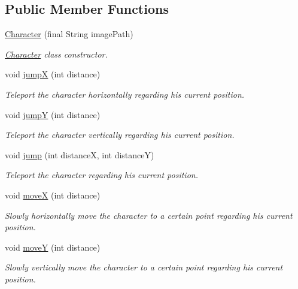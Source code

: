 \subsection*{Public Member Functions}
\begin{DoxyCompactItemize}
\item 
\hyperlink{classworld_1_1character_1_1_character_a13c73f58bdba70ca3080d001140fd18a}{Character} (final String image\-Path)
\begin{DoxyCompactList}\small\item\em \hyperlink{classworld_1_1character_1_1_character}{Character} class constructor. \end{DoxyCompactList}\item 
void \hyperlink{classworld_1_1character_1_1_character_a1c4f59dee601acfb4cf3ec000a87e142}{jump\-X} (int distance)
\begin{DoxyCompactList}\small\item\em Teleport the character horizontally regarding his current position. \end{DoxyCompactList}\item 
void \hyperlink{classworld_1_1character_1_1_character_aaddaea7c1175b19f80c0a10b87b59d75}{jump\-Y} (int distance)
\begin{DoxyCompactList}\small\item\em Teleport the character vertically regarding his current position. \end{DoxyCompactList}\item 
void \hyperlink{classworld_1_1character_1_1_character_a38da898f19b8ac87049552edb20a70c8}{jump} (int distance\-X, int distance\-Y)
\begin{DoxyCompactList}\small\item\em Teleport the character regarding his current position. \end{DoxyCompactList}\item 
void \hyperlink{classworld_1_1character_1_1_character_afd88136a2b4b1ece60657bb4481ab955}{move\-X} (int distance)
\begin{DoxyCompactList}\small\item\em Slowly horizontally move the character to a certain point regarding his current position. \end{DoxyCompactList}\item 
void \hyperlink{classworld_1_1character_1_1_character_af0dd57e9b3d6a43fec1292f5333f0208}{move\-Y} (int distance)
\begin{DoxyCompactList}\small\item\em Slowly vertically move the character to a certain point regarding his current position. \end{DoxyCompactList}\item 

\end{DoxyCompactItemize}
